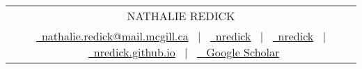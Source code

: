 \documentclass[a4paper,10pt]{article}
\def\light#1{{\color{light}#1}}
\begin{document}

\begin{tabularx}{\linewidth}{@{} C @{}}
    \huge{\scshape \light{NATHALIE} REDICK} \\ %
    \vspace{1pt}
    \href{mailto:nathalie.redick@mail.mcgill.ca}{\raisebox{-0.05\height}{\color{highlightcolor}\faEnvelope} \ nathalie.redick@mail.mcgill.ca} \ $|$ \
    \href{https://github.com/nredick}{\raisebox{-0.05\height}{\color{highlightcolor}\faGithub}\ nredick} \ $|$ \
    \href{https://linkedin.com/in/nredick}{\raisebox{-0.05\height}{\color{highlightcolor}\faLinkedin}\ nredick} \ $|$ \
    \href{https://nredick.github.io}{\raisebox{-0.05\height}{\color{highlightcolor}\faGlobe}\ nredick.github.io} \ $|$ \
    \href{https://scholar.google.com/citations?user=lvM_6HMAAAAJ\&hl=en}{\raisebox{-0.05\height}{\color{highlightcolor}\faGraduationCap} \ Google Scholar}
\end{tabularx}

\vspace{-8pt}
\end{document}
